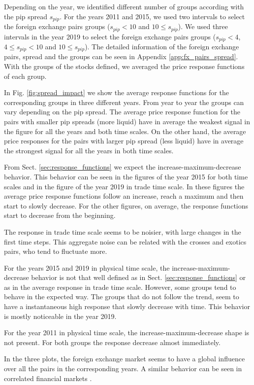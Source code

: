 Depending on the year, we identified different number of groups according with
the pip spread $s_{pip}$. For the years 2011 and 2015, we used two intervals to
select the foreign exchange pairs groups ($s_{pip}<10$ and $10 \le s_{pip}$).
We used three intervals in the year 2019 to select the foreign exchange pairs
groups ($s_{pip}<4$, $4 \le s_{pip} < 10$ and $10 \le s_{pip}$). The detailed
information of the foreign exchange pairs, spread and the groups can be seen in
Appendix \ref{app:fx_pairs_spread}. With the groups of the stocks defined, we
averaged the price response functions of each group.

In Fig. \ref{fig:spread_impact} we show the average response functions for
the corresponding groups in three different years. From year to year the groups
can vary depending on the pip spread. The average price response function for
the pairs with smaller pip spreads (more liquid) have in average the weakest
signal in the figure for all the years and both time scales. On the other hand,
the average price responses for the pairs with larger pip spread (less liquid)
have in average the strongest signal for all the years in both time scales.

From Sect. \ref{sec:response_functions} we expect the increase-maximum-decrease
behavior. This behavior can be seen in the figures of the year 2015 for both
time scales and in the figure of the year 2019 in trade time scale. In these
figures the average price response functions follow an increase, reach a
maximum and then start to slowly decrease. For the other figures, on average,
the response functions start to decrease from the beginning.

The response in trade time scale seems to be noisier, with large changes in the
first time steps. This aggregate noise can be related with the crosses and
exotics pairs, who tend to fluctuate more.

For the years 2015 and 2019 in physical time scale, the
increase-maximum-decrease behavior is not that well defined as in Sect.
\ref{sec:response_functions} or as in the average response in trade time scale.
However, some groups tend to behave in the expected way. The groups that do not
follow the trend, seem to have a instantaneous high response that slowly
decrease with time. This behavior is mostly noticeable in the year 2019.

For the year 2011 in physical time scale, the increase-maximum-decrease shape
is not present. For both groups the response decrease almost immediately.

In the three plots, the foreign exchange market seems to have a global
influence over all the pairs in the corresponding years. A similar behavior
can be seen in correlated financial markets \cite{my_paper_response_financial}.